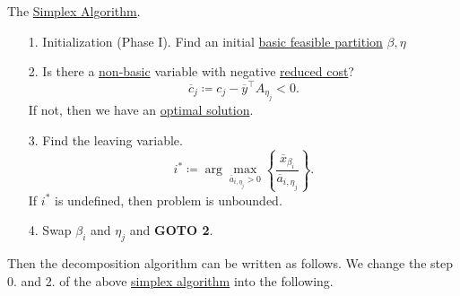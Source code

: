 \begin{prev}
	The \hyperref[algo:simplex-algorithm]{Simplex Algorithm}.
	\begin{enumerate}
		\item[1.] Initialization (Phase I). Find an initial \hyperref[def:basic-partition]{basic feasible partition} \(\beta, \eta\)
		\item[2.] Is there a \hyperref[def:non-basic]{non-basic} variable with negative \hyperref[def:reduced-cost]{reduced cost}?
			\[
				\overline{c}_j \coloneqq c_{j} - \overline{y}^{\top}A_{\eta_{j}}<0.
			\]
			If not, then we have an \hyperref[def:optimal-solution]{optimal solution}.
		\item[3.] Find the leaving variable.
			\[
				i^{\ast} \coloneqq \arg\max_{\overline{a}_{i, \eta_{j}}>0} {\left\{\frac{\overline{x}_{\beta_{i}}}{\overline{a}_{i, \eta_{j}}}\right\}}.
			\]
			If \(i^{\ast}\) is undefined, then problem is unbounded.
		\item[4.] Swap \(\beta_{i}\) and \(\eta_{j}\) and \textbf{GOTO 2}.
	\end{enumerate}
\end{prev}
Then the decomposition algorithm can be written as follows. We change the step 0. and 2. of the above \hyperref[algo:simplex-algorithm]{simplex algorithm} into the following.
